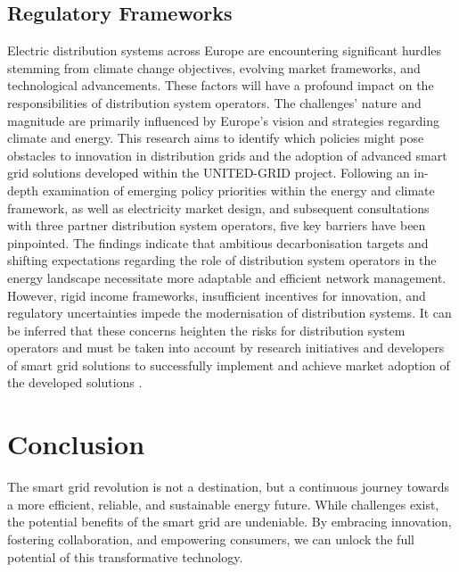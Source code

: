 \subsection{Regulatory Frameworks}
Electric distribution systems across Europe are encountering significant hurdles stemming from climate change objectives, evolving market frameworks, and technological advancements. These factors will have a profound impact on the responsibilities of distribution system operators. The challenges' nature and magnitude are primarily influenced by Europe's vision and strategies regarding climate and energy. This research aims to identify which policies might pose obstacles to innovation in distribution grids and the adoption of advanced smart grid solutions developed within the UNITED-GRID project. Following an in-depth examination of emerging policy priorities within the energy and climate framework, as well as electricity market design, and subsequent consultations with three partner distribution system operators, five key barriers have been pinpointed. The findings indicate that ambitious decarbonisation targets and shifting expectations regarding the role of distribution system operators in the energy landscape necessitate more adaptable and efficient network management. However, rigid income frameworks, insufficient incentives for innovation, and regulatory uncertainties impede the modernisation of distribution systems. It can be inferred that these concerns heighten the risks for distribution system operators and must be taken into account by research initiatives and developers of smart grid solutions to successfully implement and achieve market adoption of the developed solutions \cite{rossi2020study}. 
\newpage
\section*{Conclusion}
The smart grid revolution is not a destination, but a continuous journey towards a more efficient, reliable, and sustainable energy future. While challenges exist, the potential benefits of the smart grid are undeniable. By embracing innovation, fostering collaboration, and empowering consumers, we can unlock the full potential of this transformative technology.

